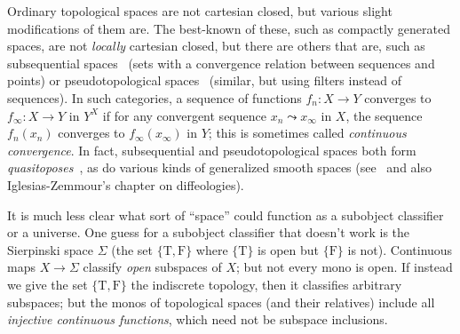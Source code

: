 \documentclass[10pt]{article}
\def\oo{\ensuremath{\infty}}
\def\true{\mathrm{T}}
\def\false{\mathrm{F}}
\numberwithin{equation}{section}
\begin{document}
Ordinary topological spaces are not cartesian closed, but various slight modifications of them are.
The best-known of these, such as compactly generated spaces, are not \emph{locally} cartesian closed,
but there are others that are, such as subsequential spaces~\cite{ptj:topological-topos} (sets with a convergence relation between sequences and points) or pseudotopological spaces~\cite{choquet:convergences,wyler:topoi-in-topology} (similar, but using filters instead of sequences).
In such categories, %
a sequence of functions $f_n:X\to Y$ converges to $f_\oo:X\to Y$ in $Y^X$ if for any convergent sequence $x_n \leadsto x_\oo$ in $X$, the sequence $f_n(x_n)$ converges to $f_\oo(x_\oo)$ in $Y$; this is sometimes called \emph{continuous convergence}.
In fact, subsequential and pseudotopological spaces both form \emph{quasitoposes}~\cite{wyler:quasitopoi}, as do various kinds of generalized smooth spaces (see~\cite{bh:cc-smooth} and also Iglesias-Zemmour's chapter on diffeologies).


It is much less clear what sort of ``space'' could function as a subobject classifier or a universe.
One guess for a subobject classifier that doesn't work is the Sierpinski space $\Sigma$ (the set $\{\true,\false\}$ where $\{\true\}$ is open but $\{\false\}$ is not).
Continuous maps $X\to \Sigma$ classify \emph{open} subspaces of $X$; but not every mono is open. %
If instead we give the set $\{\true,\false\}$ the indiscrete topology, then it classifies arbitrary subspaces; but the monos of topological spaces (and their relatives) include all \emph{injective continuous functions}, which need not be subspace inclusions.
\end{document}
